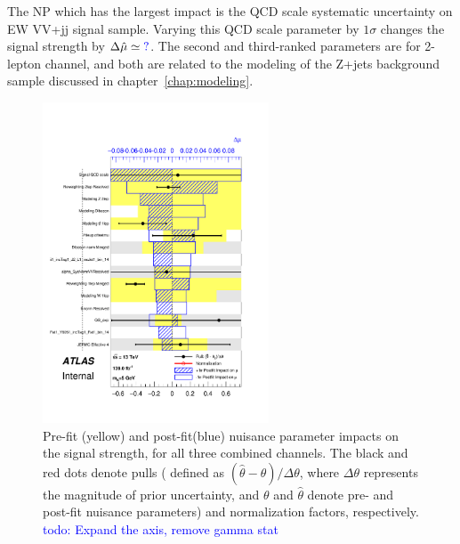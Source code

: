 The NP which has the largest impact is the QCD scale systematic uncertainty on EW VV+jj signal sample. 
Varying this QCD scale parameter by $1\sigma$ changes the signal strength by $\Delta \hat{\mu} \simeq \textcolor{blue}{?}$.
The second and third-ranked parameters are for 2-lepton channel, and both are related to the modeling of the Z+jets background sample discussed in chapter~\ref{chap:modeling}.
\begin{figure}[ht]
      \centering
        \includegraphics[width=0.60\textwidth]{figures/2lep/FitResults/pulls_mu_SemileptonicVBS_5.pdf}
        \caption{Pre-fit (yellow) and post-fit(blue) nuisance parameter impacts on the signal strength, for all three combined channels. The black and red dots denote pulls ( defined as $(\hat{\theta}-\theta) / \Delta \theta$, where $\Delta \theta$ represents the magnitude of prior uncertainty, and $\theta$ and $\hat{\theta}$ denote pre- and post-fit nuisance parameters) and normalization factors, respectively. \textcolor{blue}{todo: Expand the axis, remove gamma stat}}
       \label{fig:fit_2lep_ranking_all}
\end{figure}

